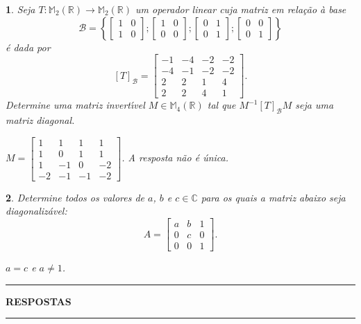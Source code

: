 \documentclass[12pt]{exam}
\newtheorem{exercicio}{}
\newcommand{\real}{\mathbb{R}}
\newcommand{\complex}{\mathbb{C}}
\newcommand{\cp}[1]{\mathbb{#1}}
\begin{document}
\begin{exercicio}
  Seja $T : \cp{M}_2(\real) \to \cp{M}_2(\real)$ um operador linear cuja matriz em rela\c{c}\~ao \`a base
  \[
    \mathcal{B} = \left\{\begin{bmatrix}1 & 0\\ 1 & 0\end{bmatrix}; \begin{bmatrix}1 & 0\\ 0 & 0\end{bmatrix}; \begin{bmatrix}0 & 1\\ 0 & 1\end{bmatrix}; \begin{bmatrix}0 & 0\\ 0 & 1\end{bmatrix}\right\}
  \]
  \'e dada por
  \[
    [T]_\mathcal{B} = \begin{bmatrix}
      -1 & -4 & -2 & -2\\
      -4 & -1 & -2 & -2\\
      2 & 2 & 1 & 4\\
      2 & 2 & 4 & 1
    \end{bmatrix}.
  \]
  Determine uma matriz invert{\'\i}vel $M \in \cp{M}_4(\real)$ tal que $M^{-1}[T]_\mathcal{B}M$ seja uma matriz diagonal.
\begin{solucao}
  $M = \begin{bmatrix}
    1 & 1 & 1 & 1\\
    1 & 0 & 1 & 1\\
    1 & -1 & 0 & -2\\
    -2 & -1 & -1 & -2
  \end{bmatrix}$. A resposta n\~ao \'e \'unica.
\end{solucao}
\end{exercicio}

\begin{exercicio}
  Determine todos os valores de $a$, $b$ e $c \in \complex$ para os quais a matriz abaixo seja diagonaliz\'avel:
  \[
    A = \begin{bmatrix}
      a & b & 1\\
      0 & c & 0\\
      0 & 0 & 1
    \end{bmatrix}.
  \]
  \begin{solucao}
    $a = c$ e $a \ne 1$.
  \end{solucao}
\end{exercicio}

\newpage
{}
\hrule
\begin{center}
{\large\bf RESPOSTAS}
\end{center}
\hrule

\end{document}
